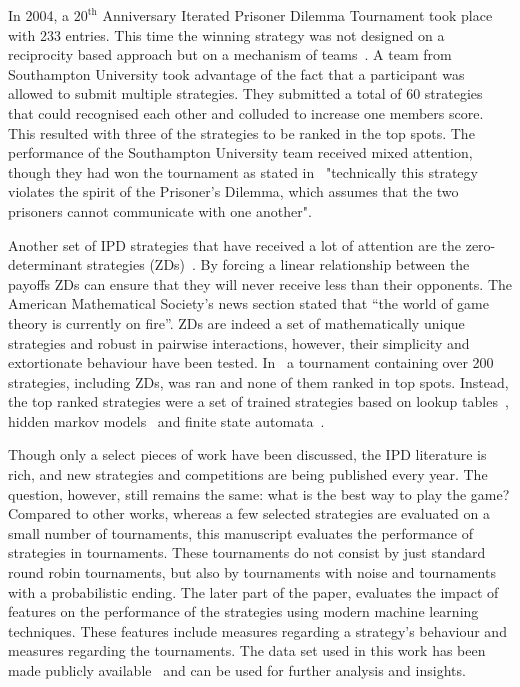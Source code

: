 In 2004, a $20^{\text{th}}$ Anniversary Iterated Prisoner Dilemma Tournament
took place with 233 entries. This time the winning strategy was not designed on
a reciprocity based approach but on a mechanism of
teams~\cite{J.P.Delahaye1993Lp, J.P.Delahaye1995LIeP, A.Rogers2007Ctpw}. A team
from Southampton University took advantage of the fact that a participant was
allowed to submit multiple strategies. They submitted a total of 60 strategies
that could recognised each other and colluded to increase one members score.
This resulted with three of the strategies to be ranked in the top spots. The
performance of the Southampton University team received mixed attention, though
they had won the tournament as stated in~\cite{us_blog} "technically this
strategy violates the spirit of the Prisoner's Dilemma, which assumes that the
two prisoners cannot communicate with one another".

Another set of IPD strategies that have received a lot of attention
are the zero-determinant strategies (ZDs)~\cite{Press2012}. By
forcing a linear relationship between the payoffs ZDs can ensure that they will
never receive less than their opponents. The
American Mathematical Society's news section stated that ``the world of game
theory is currently on fire''.
ZDs are indeed a set of mathematically unique strategies
and robust in pairwise interactions, however, their simplicity and extortionate
behaviour have been tested. In~\cite{Harper2017} a tournament containing over
200 strategies, including ZDs, was ran and none of them
ranked in top spots. Instead, the top ranked strategies were a set of
trained strategies based on lookup tables~\cite{Axelrod1987}, hidden markov
models~\cite{Harper2017} and finite state automata~\cite{Miller1996}.

Though only a select pieces of work have been discussed, the IPD literature is
rich, and new strategies and competitions are being published every year. The
question, however, still remains the same: what is the best way to play the
game? Compared to other works, whereas a few selected strategies are evaluated
on a small number of tournaments, this manuscript evaluates the performance of \numberofstrategies
strategies in \numberofalltournaments tournaments. These tournaments do not
consist by just standard round robin tournaments, but also by tournaments with noise
and tournaments with a probabilistic ending. The later part of the paper, evaluates
the impact of features on the performance of the strategies using modern
machine learning techniques. These features include measures regarding a
strategy's behaviour and measures regarding the tournaments. The data set used
in this work has been made publicly available~\cite{Glynatsi_2019_metatournament} and can be used
for further analysis and insights.

